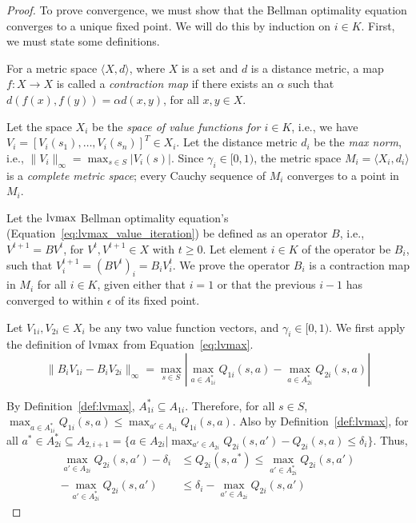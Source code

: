 \begin{proof}
To prove convergence, we must show that the Bellman optimality equation converges to a unique fixed point. We will do this by induction on $i \in K$. First, we must state some definitions.

For a metric space $\langle X, d \rangle$, where $X$ is a set and $d$ is a distance metric, a map $f : X \rightarrow X$ is called a \emph{contraction map} if there exists an $\alpha$ such that $d(f(x), f(y)) = \alpha d(x, y)$, for all $x, y \in X$.

Let the space $X_i$ be the \emph{space of value functions for $i \in K$}, i.e., we have $V_i = [V_i(s_1), \ldots, V_i(s_n)]^T \in X_i$. Let the distance metric $d_i$ be the \emph{max norm}, i.e., $\|V_i\|_\infty = \max_{s \in S} |V_i(s)|$. Since $\gamma_i \in [0, 1)$, the metric space $M_i = \langle X_i, d_i \rangle$ is a \emph{complete metric space}; every Cauchy sequence of $M_i$ converges to a point in $M_i$.

Let the $\operatorname*{lvmax}$ Bellman optimality equation's (Equation~\ref{eq:lvmax_value_iteration}) be defined as an operator $B$, i.e., $V^{t+1} = B V^t$, for $V^t, V^{t+1} \in X$ with $t \geq 0$. Let element $i \in K$ of the operator be $B_i$, such that $V_i^{t+1} = (B V^t)_i = B_i V_i^t$. We prove the operator $B_i$ is a contraction map in $M_i$ for all $i \in K$, given either that $i=1$ or that the previous $i-1$ has converged to within $\epsilon$ of its fixed point.

Let $V_{1i}, V_{2i} \in X_i$ be any two value function vectors, and $\gamma_i \in [0, 1)$. We first apply the definition of $\operatorname*{lvmax}$ from Equation~\ref{eq:lvmax}.
\begin{equation*}
    \| B_i V_{1i} - B_i V_{2i} \|_\infty = \max_{s \in S} | \max_{a \in A_{1i}^*} Q_{1i}(s, a) - \max_{a \in A_{2i}^*} Q_{2i}(s, a) |
\end{equation*}

By Definition~\ref{def:lvmax}, $A_{1i}^* \subseteq A_{1i}$. Therefore, for all $s \in S$, $\max_{a \in A_{1i}^*} Q_{1i}(s, a) \leq \max_{a' \in A_{1i}} Q_{1i}(s, a)$. Also by Definition~\ref{def:lvmax}, for all $a^* \in A_{2i}^* \subseteq A_{2,i+1} = \{a \in A_{2i} | \max_{a' \in A_{2i}} Q_{2i}(s, a') - Q_{2i}(s, a) \leq \delta_i \}$. Thus,
\begin{align*}
    \max_{a' \in A_{2i}} Q_{2i}(s, a') - \delta_i &\leq Q_{2i}(s, a^*) \leq \max_{a' \in A_{2i}^*} Q_{2i} (s, a') \\
    -\max_{a' \in A_{2i}^*} Q_{2i} (s, a') &\leq \delta_i - \max_{a' \in A_{2i}} Q_{2i}(s, a')
\end{align*}


\end{proof}
